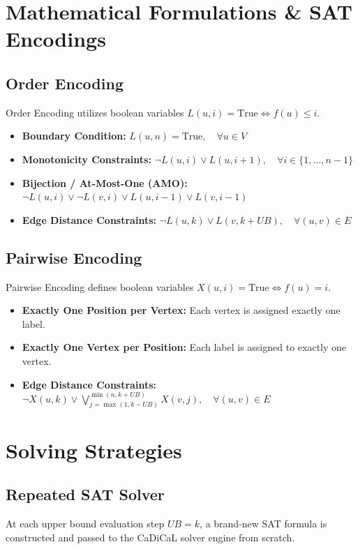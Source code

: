 
\section{Mathematical Formulations \& SAT Encodings}

\subsection{Order Encoding}
Order Encoding utilizes boolean variables $L(u, i) = \text{True} \iff f(u) \le i$. 
\begin{itemize}
    \item \textbf{Boundary Condition:} $L(u, n) = \text{True}, \quad \forall u \in V$
    \item \textbf{Monotonicity Constraints:} $\neg L(u, i) \lor L(u, i+1), \quad \forall i \in \{1, \dots, n-1\}$
    \item \textbf{Bijection / At-Most-One (AMO):} $\neg L(u, i) \lor \neg L(v, i) \lor L(u, i-1) \lor L(v, i-1)$
    \item \textbf{Edge Distance Constraints:} $\neg L(u, k) \lor L(v, k + UB), \quad \forall (u,v) \in E$
\end{itemize}

\subsection{Pairwise Encoding}
Pairwise Encoding defines boolean variables $X(u, i) = \text{True} \iff f(u) = i$.
\begin{itemize}
    \item \textbf{Exactly One Position per Vertex:} Each vertex is assigned exactly one label.
    \item \textbf{Exactly One Vertex per Position:} Each label is assigned to exactly one vertex.
    \item \textbf{Edge Distance Constraints:} $\neg X(u, k) \lor \bigvee_{j = \max(1, k-UB)}^{\min(n, k+UB)} X(v, j), \quad \forall (u,v) \in E$
\end{itemize}

\section{Solving Strategies}

\subsection{Repeated SAT Solver}
At each upper bound evaluation step $UB = k$, a brand-new SAT formula is constructed and passed to the CaDiCaL solver engine from scratch.

